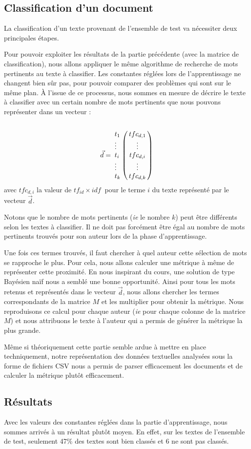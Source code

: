 \documentclass[a4paper,12pt]{report}
\begin{document}
\subsection{Classification d'un document}
La classification d'un texte provenant de l'ensemble de test va nécessiter deux principales étapes. 

Pour pouvoir exploiter les résultats de la partie précédente (avec la matrice de classification), nous allons appliquer le même algorithme de recherche de mots pertinents au texte à classifier. Les constantes réglées lors de l'apprentissage ne changent bien sûr pas, pour pouvoir comparer des problèmes qui sont sur le même plan. À l'issue de ce processus, nous sommes en mesure de décrire le texte à classifier avec un certain nombre de mots pertinents que nous pouvons représenter dans un vecteur : 
\[
\vec{d}= \bordermatrix{
& \cr
t_{1} & tfc_{d,1} \cr
\vdots & \vdots \cr
t_{i} & tfc_{d,i} \cr
\vdots & \vdots \cr
t_{k} & tfc_{d,k} \cr
}
\]
avec $tfc_{d,i}$ la valeur de $tf_{id} \times idf\ $ pour le terme $i$ du texte représenté par le vecteur $\vec{d}$.

Notons que le nombre de mots pertinents (\textit{ie} le nombre $k$) peut être différents selon les textes à classifier. Il ne doit pas forcément être égal au nombre de mots pertinents trouvés pour son auteur lors de la phase d'apprentissage.

Une fois ces termes trouvés, il faut chercher à quel auteur cette sélection de mots se rapproche le plus. Pour cela, nous allons calculer une métrique à même de représenter cette proximité. En nous inspirant du cours, une solution de type Bayésien naïf nous a semblé une bonne opportunité. Ainsi pour tous les mots retenus et représentés dans le vecteur $\vec{d}$, nous allons chercher les termes correspondants de la matrice $M$ et les multiplier  pour obtenir la métrique. Nous reproduisons ce calcul pour chaque auteur (\textit{ie} pour chaque colonne de la matrice $M$) et nous attribuons le texte à l'auteur qui a permis de générer la métrique la plus grande.  

Même si théoriquement cette partie semble ardue à mettre en place techniquement, notre représentation des données textuelles analysées sous la forme de fichiers CSV nous a permis de parser efficacement les documents et de calculer la métrique plutôt efficacement. 

\subsection{Résultats}
Avec les valeurs des constantes réglées dans la partie d'apprentissage, nous sommes arrivés à un résultat plutôt moyen. En effet, sur les textes de l'ensemble de test, seulement 47\% des textes sont bien classés et 6 ne sont pas classés. 
\end{document}
